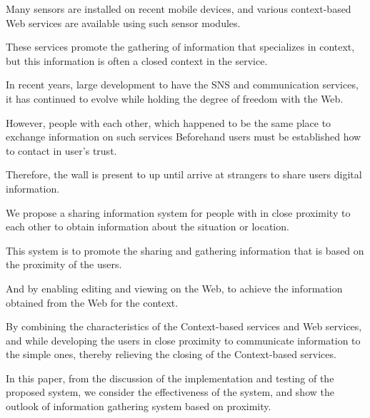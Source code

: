 \begin{eabstract}

Many sensors are installed on recent mobile devices, and various
context-based Web services are available using such sensor modules.

These services promote the gathering of information that specializes in context,
but this information is often a closed context in the service.

In recent years, large development to have the SNS and communication services,
it has continued to evolve while holding the degree of freedom with the Web.

However, people with each other, which happened to be the same place to exchange information on such services
Beforehand users must be established how to contact in user's trust.

Therefore, the wall is present to up until arrive at strangers to share users digital information.

We propose a sharing information system for people
with in close proximity to each other to obtain information about the situation or location.

This system is to promote the sharing and gathering information
that is based on the proximity of the users.

And by enabling editing and viewing on the Web,
to achieve the information obtained from the Web for the context.

By combining the characteristics of the Context-based services and Web services,
and while developing the users in close proximity
to communicate information to the simple ones,
thereby relieving the closing of the Context-based services.

In this paper,
from the discussion of the implementation and testing of the proposed system,
we consider the effectiveness of the system,
and show the outlook of information gathering system based on proximity.

\end{eabstract}
